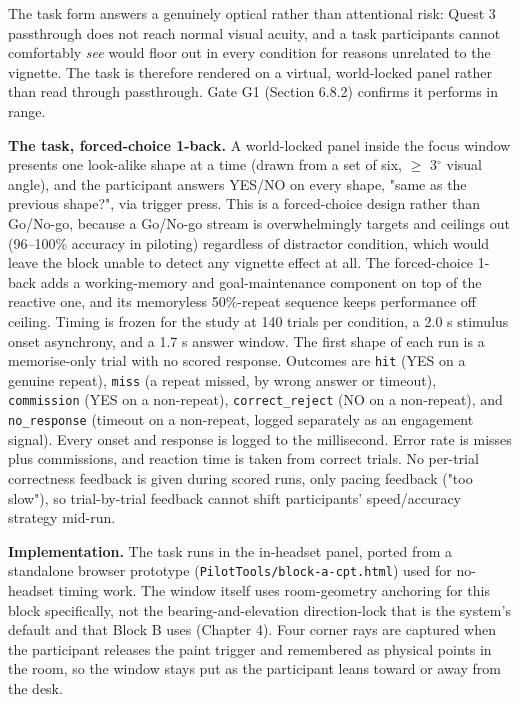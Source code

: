 The task form answers a genuinely optical rather than attentional risk: Quest 3 passthrough does not
reach normal visual acuity, and a task participants cannot comfortably \textit{see} would floor out in
every condition for reasons unrelated to the vignette. The task is therefore rendered on a virtual,
world-locked panel rather than read through passthrough. Gate G1 (Section 6.8.2) confirms it performs
in range.

\textbf{The task, forced-choice 1-back.} A world-locked panel inside the focus window presents one
look-alike shape at a time (drawn from a set of six, $\geq$ 3$^{\circ}$ visual angle), and the participant
answers YES/NO on every shape, "same as the previous shape?", via trigger press. This is a
forced-choice design rather than Go/No-go, because a Go/No-go stream is overwhelmingly targets and
ceilings out (96–100\% accuracy in piloting) regardless of distractor condition, which would leave
the block unable to detect any vignette effect at all. The forced-choice 1-back adds a
working-memory and goal-maintenance component on top of the reactive one, and its memoryless
50\%-repeat sequence keeps performance off ceiling. Timing is frozen for the study at 140 trials per
condition, a 2.0 s stimulus onset asynchrony, and a 1.7 s answer window. The first
shape of each run is a memorise-only trial with no scored response. Outcomes are \verb|hit| (YES on a
genuine repeat), \verb|miss| (a repeat missed, by wrong answer or timeout), \verb|commission| (YES on a
non-repeat), \verb|correct_reject| (NO on a non-repeat), and \verb|no_response| (timeout on a non-repeat,
logged separately as an engagement signal). Every onset and response is logged to the millisecond.
Error rate is misses plus commissions, and reaction time is taken from correct trials. No per-trial
correctness feedback is given during scored runs, only pacing feedback ("too slow"), so
trial-by-trial feedback cannot shift participants' speed/accuracy strategy mid-run.

\textbf{Implementation.} The task runs in the in-headset panel, ported from a standalone browser
prototype (\verb|PilotTools/block-a-cpt.html|) used for no-headset timing work. The window itself
uses room-geometry anchoring for this block specifically, not the
bearing-and-elevation direction-lock that is the system's default and that Block B uses (Chapter 4).
Four corner rays are captured when the participant releases the paint trigger and remembered as
physical points in the room, so the window stays put as the participant leans toward or away from the
desk.

